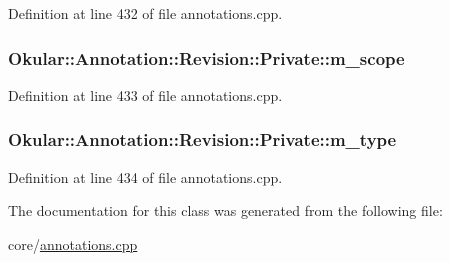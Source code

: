 Definition at line 432 of file annotations.\+cpp.

\hypertarget{classAnnotation_1_1Revision_1_1Private_aac1b9a60c31ba65a3301b3bf8a8c4d0f}{
\subsubsection[{m\+\_\+scope}]{ Okular\+::\+Annotation\+::\+Revision\+::\+Private\+::m\+\_\+scope}}\label{classAnnotation_1_1Revision_1_1Private_aac1b9a60c31ba65a3301b3bf8a8c4d0f}


Definition at line 433 of file annotations.\+cpp.

\hypertarget{classAnnotation_1_1Revision_1_1Private_a2cea518ec5656c3a4e48d18d40bcf7b5}{
\subsubsection[{m\+\_\+type}]{ Okular\+::\+Annotation\+::\+Revision\+::\+Private\+::m\+\_\+type}}\label{classAnnotation_1_1Revision_1_1Private_a2cea518ec5656c3a4e48d18d40bcf7b5}


Definition at line 434 of file annotations.\+cpp.



The documentation for this class was generated from the following file\+:\begin{DoxyCompactItemize}
\item 
core/\hyperlink{annotations_8cpp}{annotations.\+cpp}\end{DoxyCompactItemize}
